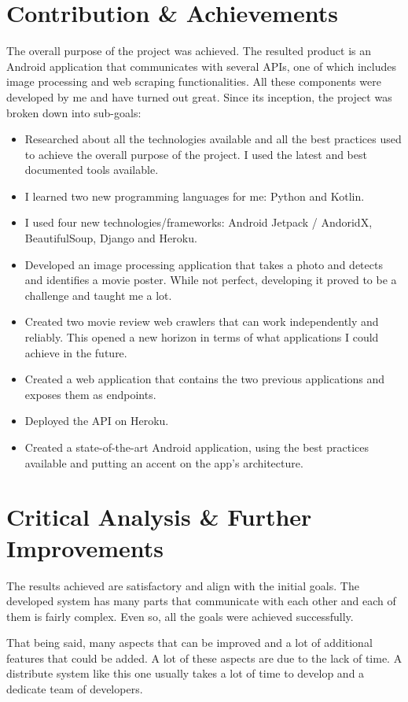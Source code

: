 \documentclass[12pt,a4paper,twoside]{report}
\begin{document}
\section{Contribution \& Achievements}
The overall purpose of the project was achieved. The resulted product is an Android application that communicates with several APIs, one of which includes image processing and web scraping functionalities. All these components were developed by me and have turned out great. Since its inception, the project was broken down into sub-goals:
\begin{itemize}
    \item Researched about all the technologies available and all the best practices used to achieve the overall purpose of the project. I used the latest and best documented tools available. 
    \item I learned two new programming languages for me: Python and Kotlin.
    \item I used four new technologies/frameworks: Android Jetpack / AndoridX, BeautifulSoup, Django and Heroku.
    \item Developed an image processing application that takes a photo and detects and identifies a movie poster. While not perfect, developing it proved to be a challenge and taught me a lot.
    \item Created two movie review web crawlers that can work independently and reliably. This opened a new horizon in terms of what applications I could achieve in the future.
    \item Created a web application that contains the two previous applications and exposes them as endpoints.
    \item Deployed the API on Heroku.
    \item Created a state-of-the-art Android application, using the best practices available and putting an accent on the app's architecture.
\end{itemize}

\section{Critical Analysis \& Further Improvements}
The results achieved are satisfactory and align with the initial goals. The developed system has many parts that communicate with each other and each of them is fairly complex. Even so, all the goals were achieved successfully.

That being said, many aspects that can be improved and a lot of additional features that could be added. A lot of these aspects are due to the lack of time. A distribute system like this one usually takes a lot of time to develop and a dedicate team of developers. 
\end{document}
